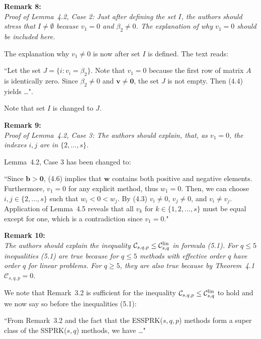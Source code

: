 \documentclass[12pt]{article}
\newcommand{\remark}[2]{\vspace{25pt} \noindent \textbf{Remark #1:\newline} \textit{#2}\vspace{15pt}}
\renewcommand{\newline}{\vspace{15pt}\\}
\newcommand{\sspcoef}{\mathcal{C}}
\newcommand{\clin}{\sspcoef^{\textnormal{lin}}_{s,q}}
\begin{document}
\remark{8}{
Proof of Lemma~4.2, Case 2: Just after defining the set $I$, the authors should stress that
$I \neq \emptyset$ because $v_1 = 0$ and $\beta_2 \neq 0$.
The explanation of why $v_1 = 0$ should be included
here.}

The explanation why $v_1 \neq 0$ is now after set $I$ is defined. The text reads:

``Let the set $J = \{i : v_i = \beta_2\}$. 
Note that $v_1 = 0$ because the first row of matrix $A$ is identically zero.
Since $\beta_2 \neq 0$ and $ \bm{v} \neq \bm{0}$, the set $J$ is not empty.
Then (4.4) yields \dots".

Note that set $I$ is changed to $J$.
	
\remark{9}{
Proof of Lemma~4.2, Case 3: The authors should explain, that, as $v_1 = 0$, the 
indexes $i,j$ are in $\{2,\dots,s\}$.}

Lemma~4.2, Case 3 has been changed to:

``Since $\bm{b} > \bm{0}$, (4.6) implies that $\bm{w}$ contains both positive 
and negative elements. 
Furthermore, $v_1=0$ for any explicit method, thus $w_1=0$.
Then, we can choose $i, j \in \{2, \dots, s\}$ such that $w_i < 0 < w_j$.
By (4.3) $v_i\ne 0$, $v_j\ne 0$, and $v_i\ne v_j$.
Application of Lemma~4.5 reveals that all $v_k$ for 
$k \in\{1,2,\dots,s\}$ must be equal except for one, which is a contradiction
since $v_1 = 0$."

\remark{10}{
The authors should explain the inequality $\sspcoef_{s,q,p} \leq \clin$ in formula (5.1). 
For $q \leq 5$ inequalities (5.1) are true because for $q \leq 5$ methods with effective 
order $q$ have order $q$ for linear problems. 
For $q \geq 5$, they are also true because by Theorem~4.1 $\sspcoef_{s,q,p}  = 0$.}

We note that Remark~3.2 is sufficient for the inequality 
$\sspcoef_{s,q,p} \leq \clin$ to hold and we now say so before the inequalities (5.1):

``From Remark~3.2 and the fact that the ESSPRK($s,q,p$) methods 
form a super class of the SSPRK($s,q$) methods, we have \dots"
\end{document}

